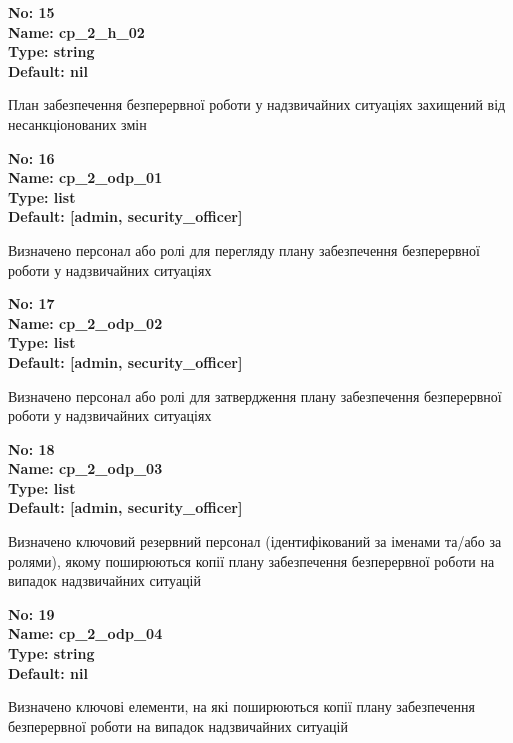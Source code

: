 \documentclass{article}
\begin{document}
{\footnotesize\bfseries
No: 15\\
Name: cp\_\allowbreak{}2\_\allowbreak{}h\_\allowbreak{}02\\
Type: string\\
Default: nil
}

{\footnotesize План забезпечення безперервної роботи у надзвичайних ситуаціях захищений від несанкціонованих змін}


{\footnotesize\bfseries
No: 16\\
Name: cp\_\allowbreak{}2\_\allowbreak{}odp\_\allowbreak{}01\\
Type: list\\
Default: [\textquotedbl{}admin\textquotedbl{}, \textquotedbl{}security\_\allowbreak{}officer\textquotedbl{}]
}

{\footnotesize Визначено персонал або ролі для перегляду плану забезпечення безперервної роботи у надзвичайних ситуаціях}


{\footnotesize\bfseries
No: 17\\
Name: cp\_\allowbreak{}2\_\allowbreak{}odp\_\allowbreak{}02\\
Type: list\\
Default: [\textquotedbl{}admin\textquotedbl{}, \textquotedbl{}security\_\allowbreak{}officer\textquotedbl{}]
}

{\footnotesize Визначено персонал або ролі для затвердження плану забезпечення безперервної роботи у надзвичайних ситуаціях}


{\footnotesize\bfseries
No: 18\\
Name: cp\_\allowbreak{}2\_\allowbreak{}odp\_\allowbreak{}03\\
Type: list\\
Default: [\textquotedbl{}admin\textquotedbl{}, \textquotedbl{}security\_\allowbreak{}officer\textquotedbl{}]
}

{\footnotesize Визначено ключовий резервний персонал (ідентифікований за іменами та/або за ролями), якому поширюються копії плану забезпечення безперервної роботи на випадок надзвичайних ситуацій}


{\footnotesize\bfseries
No: 19\\
Name: cp\_\allowbreak{}2\_\allowbreak{}odp\_\allowbreak{}04\\
Type: string\\
Default: nil
}

{\footnotesize Визначено ключові елементи, на які поширюються копії плану забезпечення безперервної роботи на випадок надзвичайних ситуацій}
\end{document}
